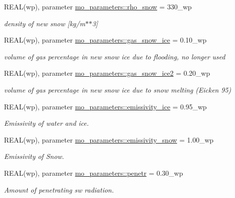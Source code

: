 \begin{DoxyCompactItemize}
REAL(wp), parameter \hyperlink{namespacemo__parameters_aca92cfe6ef280bfaccdfefb83e06f114}{mo\_\-parameters::rho\_\-snow} = 330\_\-wp
\begin{DoxyCompactList}\small\item\em density of new snow \mbox{[}kg/m$\ast$$\ast$3\mbox{]} \item\end{DoxyCompactList}\item 
REAL(wp), parameter \hyperlink{namespacemo__parameters_a37ad2fc4cadab9eda79a630a8744079e}{mo\_\-parameters::gas\_\-snow\_\-ice} = 0.10\_\-wp
\begin{DoxyCompactList}\small\item\em volume of gas percentage in new snow ice due to flooding, no longer used \item\end{DoxyCompactList}\item 
REAL(wp), parameter \hyperlink{namespacemo__parameters_ad2c04994a7c8e261cbdaa50e2790cd56}{mo\_\-parameters::gas\_\-snow\_\-ice2} = 0.20\_\-wp
\begin{DoxyCompactList}\small\item\em volume of gas percentage in new snow ice due to snow melting (Eicken 95) \item\end{DoxyCompactList}\item 
REAL(wp), parameter \hyperlink{namespacemo__parameters_a7a1d89915a6383896c6ec8b1a13208e5}{mo\_\-parameters::emissivity\_\-ice} = 0.95\_\-wp
\begin{DoxyCompactList}\small\item\em Emissivity of water and ice. \item\end{DoxyCompactList}\item 
REAL(wp), parameter \hyperlink{namespacemo__parameters_abc3aaec08d9a954bf5ddbe3a8ba692e5}{mo\_\-parameters::emissivity\_\-snow} = 1.00\_\-wp
\begin{DoxyCompactList}\small\item\em Emissivity of Snow. \item\end{DoxyCompactList}\item 
REAL(wp), parameter \hyperlink{namespacemo__parameters_acf5feb0682a207698942d8764a0fc529}{mo\_\-parameters::penetr} = 0.30\_\-wp
\begin{DoxyCompactList}\small\item\em Amount of penetrating sw radiation. \item\end{DoxyCompactList}\item 

\end{DoxyCompactItemize}
